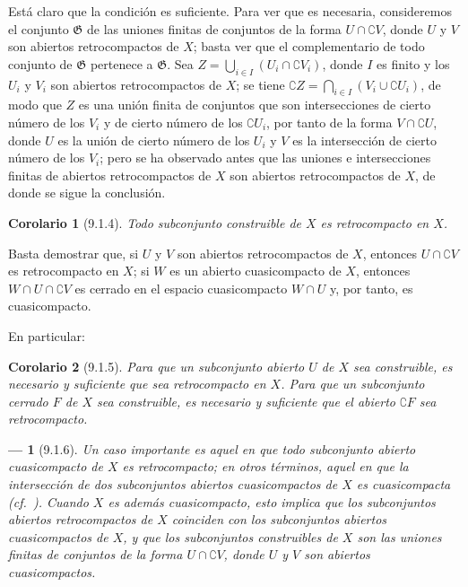 \documentclass[10pt,oneside,openany]{book}
\theoremstyle{egaenv}\newtheorem*{env}{---}
\theoremstyle{egastatement}
\newtheorem*{corollary}{Corolario}
\theoremstyle{egadescription}
\newcommand{\oldpage}[2][]{\marginnote{\normalfont\scriptsize\textbf{#1}\,|\,#2}\ignorespaces}
\begin{document}
Está claro que la condición es suficiente.
Para ver que es necesaria, consideremos el conjunto $\mathfrak{G}$ de las uniones finitas de conjuntos de la forma $U\cap\complement{V}$, donde $U$ y $V$ son abiertos retrocompactos de $X$; basta ver que el complementario de todo conjunto de $\mathfrak{G}$ pertenece a $\mathfrak{G}$.
Sea $Z=\bigcup_{i\in I}(U_i\cap\complement{V_i})$, donde $I$ es finito y los $U_i$ y $V_i$ son abiertos retrocompactos de $X$; se tiene
$\complement{Z}=\bigcap_{i\in I}(V_i\cup\complement{U_i})$, de modo que $Z$ es una unión finita de conjuntos que son intersecciones de cierto número de los $V_i$ y de cierto número de los $\complement{U_i}$, por tanto de la forma
\oldpage[0\textsubscript{III}]{13}
$V\cap\complement{U}$, donde $U$ es la unión de cierto número de los $U_i$ y $V$ es la intersección de cierto número de los $V_i$; pero se ha observado antes que las uniones e intersecciones finitas de abiertos retrocompactos de $X$ son abiertos retrocompactos de $X$, de donde se sigue la conclusión.


\begin{corollary}[9.1.4]
\label{0.9.1.4}
\label{0.9.1.4-fr}
Todo subconjunto construible de $X$ es retrocompacto en $X$.
\end{corollary}


Basta demostrar que, si $U$ y $V$ son abiertos retrocompactos de $X$, entonces $U\cap\complement{V}$ es retrocompacto en $X$; si $W$ es un abierto cuasicompacto de $X$, entonces $W\cap U\cap\complement{V}$ es cerrado en el espacio cuasicompacto $W\cap U$ y, por tanto, es cuasicompacto.


En particular:
\begin{corollary}[9.1.5]
\label{0.9.1.5}
\label{0.9.1.5-fr}
Para que un subconjunto abierto $U$ de $X$ sea construible, es necesario y suficiente que sea retrocompacto en $X$.
Para que un subconjunto cerrado $F$ de $X$ sea construible, es necesario y suficiente que el abierto $\complement{F}$ sea retrocompacto.
\end{corollary}

\begin{env}[9.1.6]
\label{0.9.1.6}
\label{0.9.1.6-fr}
Un caso importante es aquel en que todo subconjunto abierto cuasicompacto de $X$ es retrocompacto; en otros términos, aquel en que la intersección de dos subconjuntos abiertos cuasicompactos de $X$ es cuasicompacta (cf.~).
Cuando $X$ es además cuasicompacto, esto implica que los subconjuntos abiertos retrocompactos de $X$ coinciden con los subconjuntos abiertos cuasicompactos de $X$, y que los subconjuntos construibles de $X$ son las uniones finitas de conjuntos de la forma $U\cap\complement{V}$, donde $U$ y $V$ son abiertos cuasicompactos.
\end{env}
\end{document}
